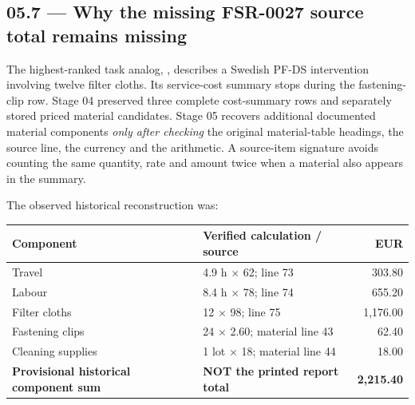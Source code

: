 \documentclass[11pt,a4paper]{article}
\DeclareRobustCommand{\code}[1]{{\ttfamily\small\detokenize{#1}}}
\begin{document}
\begin{center}
\end{center}

\subsection{05.7 --- Why the missing FSR-0027 source total remains missing}
The highest-ranked task analog, \code{FSR-0027}, describes a Swedish PF-DS intervention involving twelve filter cloths. Its service-cost summary stops during the fastening-clip row. Stage 04 preserved three complete cost-summary rows and separately stored priced material candidates. Stage 05 recovers additional documented material components \emph{only after checking} the original material-table headings, the source line, the currency and the arithmetic. A source-item signature avoids counting the same quantity, rate and amount twice when a material also appears in the summary.

The observed historical reconstruction was:

\begin{tabularx}{\textwidth}{@{}L{50mm}L{45mm}r@{}}
\toprule
\textbf{Component} & \textbf{Verified calculation / source} & \textbf{EUR}\\
\midrule
Travel & 4.9 h $\times$ 62; line 73 & 303.80\\
Labour & 8.4 h $\times$ 78; line 74 & 655.20\\
Filter cloths & 12 $\times$ 98; line 75 & 1,176.00\\
Fastening clips & 24 $\times$ 2.60; material line 43 & 62.40\\
Cleaning supplies & 1 lot $\times$ 18; material line 44 & 18.00\\
\midrule
\textbf{Provisional historical component sum} & \textbf{NOT the printed report total} & \textbf{2,215.40}\\
\bottomrule
\end{tabularx}
\end{document}
